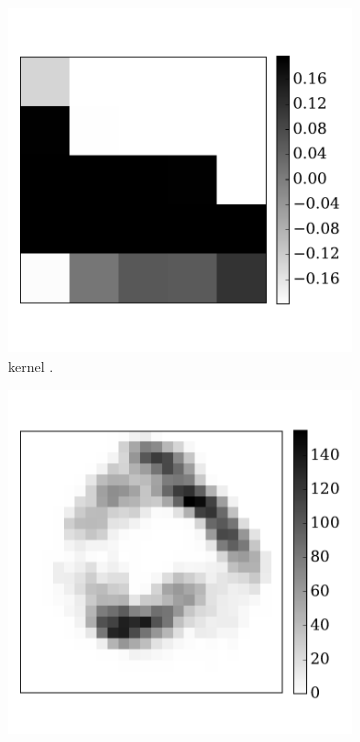\begin{figure}[htbp!]
		\begin{subfigure}[t]{0.3\textwidth}
			\includegraphics[width=\textwidth]{pics_iconip/6-3.pdf}
			\caption{\DIFdelbeginFL {}\DIFdelendFL \DIFaddbeginFL {}\DIFaddendFL kernel \DIFaddbeginFL {}\DIFaddendFL .}
			\label{Fig:63}
		\end{subfigure}
		\begin{subfigure}[t]{0.3\textwidth}
			\includegraphics[width=\textwidth]{pics_iconip/6-4.pdf}

\end{subfigure}
\end{figure}
